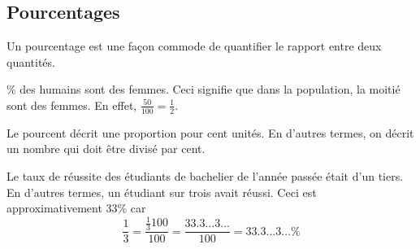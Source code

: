 
\subsection{Pourcentages}
\begin{frame}
  Un pourcentage est une façon commode de quantifier le rapport entre deux quantités.

\begin{example}
  \% des humains sont des femmes.\fg{} Ceci signifie que dans la population, la moitié sont des femmes. En effet, \(\frac{50}{100} = \frac{1}{2}\).
\end{example}
\pause

Le \og pourcent\fg{} décrit une proportion \og pour cent unités\fg{}. En d'autres termes, on décrit un nombre qui doit être divisé par cent.

\begin{example}
  \og Le taux de réussite des étudiants de bachelier de l'année passée était d'un tiers.\fg{} En d'autres termes, un étudiant sur trois avait réussi. Ceci est approximativement 33\% car
  \begin{equation*}
    \frac{1}{3} = \frac{\frac{1}{3}100}{100} = \frac{33.3\ldots3\ldots}{100} = 33.3\ldots3\ldots\%
  \end{equation*}
\end{example}
\end{frame}

